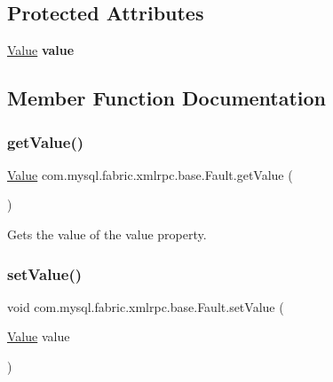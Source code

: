 \subsection*{Protected Attributes}
\begin{DoxyCompactItemize}
\item 
\mbox{\label{classcom_1_1mysql_1_1fabric_1_1xmlrpc_1_1base_1_1_fault_ae7f705e8ffa559c1e560072c7fa12904}} 
\mbox{\hyperlink{classcom_1_1mysql_1_1fabric_1_1xmlrpc_1_1base_1_1_value}{Value}} {\bfseries value}
\end{DoxyCompactItemize}


\subsection{Member Function Documentation}
\mbox{\label{classcom_1_1mysql_1_1fabric_1_1xmlrpc_1_1base_1_1_fault_ae0dd3fa0953c15b871929df9c1ad426e}} 
\subsubsection{\texorpdfstring{get\+Value()}{getValue()}}
{\footnotesize\ttfamily \mbox{\hyperlink{classcom_1_1mysql_1_1fabric_1_1xmlrpc_1_1base_1_1_value}{Value}} com.\+mysql.\+fabric.\+xmlrpc.\+base.\+Fault.\+get\+Value (\begin{DoxyParamCaption}{ }\end{DoxyParamCaption})}

Gets the value of the value property. \mbox{\label{classcom_1_1mysql_1_1fabric_1_1xmlrpc_1_1base_1_1_fault_a5155698ac5113e6d24e2b18874c5c7d4}} 
\subsubsection{\texorpdfstring{set\+Value()}{setValue()}}
{\footnotesize\ttfamily void com.\+mysql.\+fabric.\+xmlrpc.\+base.\+Fault.\+set\+Value (\begin{DoxyParamCaption}\item[{\mbox{\hyperlink{classcom_1_1mysql_1_1fabric_1_1xmlrpc_1_1base_1_1_value}{Value}}}]{value }\end{DoxyParamCaption})}

